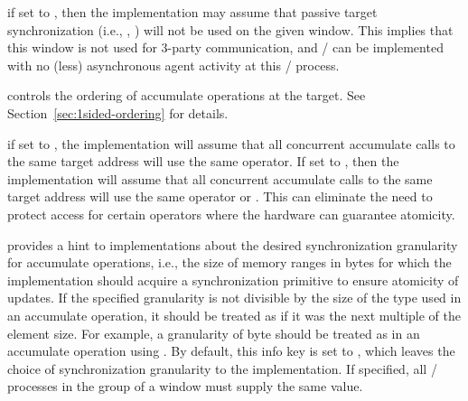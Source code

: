 \begin{description}
\item[ (boolean, default: ):]if set to ,
then the implementation may assume that passive target synchronization (i.e.,
, ) will not be used on
the given window. This implies that this window is not used for 3-party
communication, and \RMA/ can be implemented with no (less) asynchronous
agent activity at this \MPI/ process.
\item[ (string, default ):]controls the ordering of accumulate 
operations at the target.  See Section~\ref{sec:1sided-ordering} for details.
\item[ (string, default: ):]if set to ,
the implementation will assume that all concurrent accumulate calls
to the same target address will use the same operator. If set to
, then the implementation will assume that
all concurrent accumulate calls to the same target address will use the
same operator or . This can eliminate the need to
protect access for certain operators where the hardware can
guarantee atomicity.
{\sloppy %
\item[\infokeymain{mpi\_accumulate\_granularity} (integer, default \code{0}):]provides a hint to implementations about the desired synchronization granularity for accumulate operations, i.e., the size of memory ranges in bytes for which the implementation should acquire a synchronization primitive to ensure atomicity of updates.
If the specified granularity is not divisible by the size of the type used in an accumulate operation, it should be treated as if it was the next multiple of the element size.
For example, a granularity of  byte  should be treated as  in an accumulate operation using .
By default, this info key is set to , which leaves the choice of synchronization granularity to the implementation.
If specified, all \mpi/ processes in the group of a window must supply the same value.

}
\end{description}
